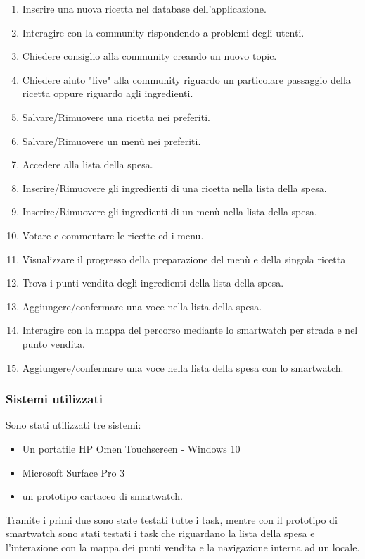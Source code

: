 \begin{enumerate}
\item Inserire una nuova ricetta nel database dell'applicazione.
\item Interagire con la community rispondendo a problemi degli utenti.
\item Chiedere consiglio alla community creando un nuovo topic.
\item Chiedere aiuto "live" alla community riguardo un particolare
passaggio della ricetta oppure riguardo agli ingredienti.

\item Salvare/Rimuovere una ricetta nei preferiti.
\item Salvare/Rimuovere un menù nei preferiti.

\item Accedere alla lista della spesa.
\item Inserire/Rimuovere gli ingredienti di una ricetta nella lista della spesa.
\item Inserire/Rimuovere gli ingredienti di un menù nella lista della spesa.

\item Votare e commentare le ricette ed i menu.

\item Visualizzare il progresso della preparazione del menù e della singola ricetta

\item Trova i punti vendita degli ingredienti della lista della spesa.
\item Aggiungere/confermare una voce nella lista della spesa.
\item Interagire con la mappa del percorso mediante lo smartwatch per strada e nel punto vendita.
\item Aggiungere/confermare una voce nella lista della spesa con lo smartwatch.
\end{enumerate}

\subsubsection*{Sistemi utilizzati}
Sono stati utilizzati tre sistemi:
\begin{itemize}
\item Un portatile HP Omen Touchscreen - Windows 10
\item Microsoft Surface Pro 3
\item un prototipo cartaceo di smartwatch.
\end{itemize}
Tramite i primi due sono state testati tutte i task, mentre con il
prototipo di smartwatch sono stati testati i task che riguardano la
lista della spesa e l'interazione con la mappa dei punti vendita e la
navigazione interna ad un locale.

